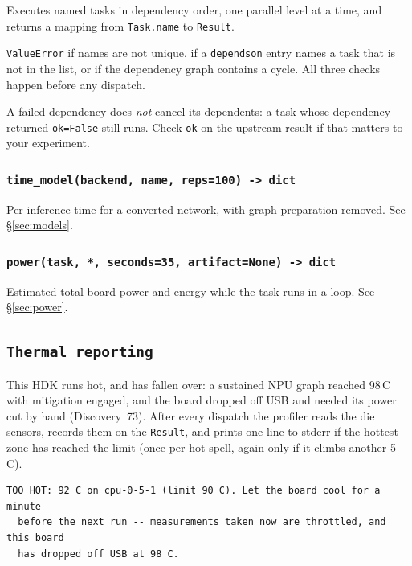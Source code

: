 \documentclass[11pt,a4paper]{article}
\newcommand{\code}[1]{\texttt{\let\_\breakableunderscore #1}}
\newcommand{\breakableunderscore}{\textunderscore\allowbreak}
\newcommand{\apient}[1]{\subsection{\texttt{#1}}}
\begin{document}
Executes named tasks in dependency order, one parallel level at a time, and
returns a mapping from \code{Task.name} to \code{Result}.

\begin{description}[leftmargin=0.8cm]
  \item[Raises] \code{ValueError} if names are not unique, if a
    \code{depends\_on} entry names a task that is not in the list, or if the
    dependency graph contains a cycle. All three checks happen before any
    dispatch.
\end{description}

\noindent A failed dependency does \emph{not} cancel its dependents: a task
whose dependency returned \code{ok=False} still runs. Check \code{ok} on the
upstream result if that matters to your experiment.

\subsubsection*{\texttt{time\_model(backend, name, reps=100) -> dict}}
\label{sec:timemodel}

Per-inference time for a converted network, with graph preparation removed.
See \S\ref{sec:models}.

\subsubsection*{\texttt{power(task, *, seconds=35, artifact=None) -> dict}}

Estimated total-board power and energy while the task runs in a loop. See
\S\ref{sec:power}.

\apient{Thermal reporting}
\label{sec:thermal}

This HDK runs hot, and has fallen over: a sustained NPU graph reached
98\,\textdegree C with mitigation engaged, and the board dropped off USB and
needed its power cut by hand (Discovery~73). After every dispatch the profiler
reads the die sensors, records them on the \code{Result}, and prints one line
to stderr if the hottest zone has reached the limit (once per hot spell, again
only if it climbs another 5\,\textdegree C).

\begin{lstlisting}[style=plain]
  TOO HOT: 92 C on cpu-0-5-1 (limit 90 C). Let the board cool for a minute
  before the next run -- measurements taken now are throttled, and this board
  has dropped off USB at 98 C.
\end{lstlisting}
\end{document}
